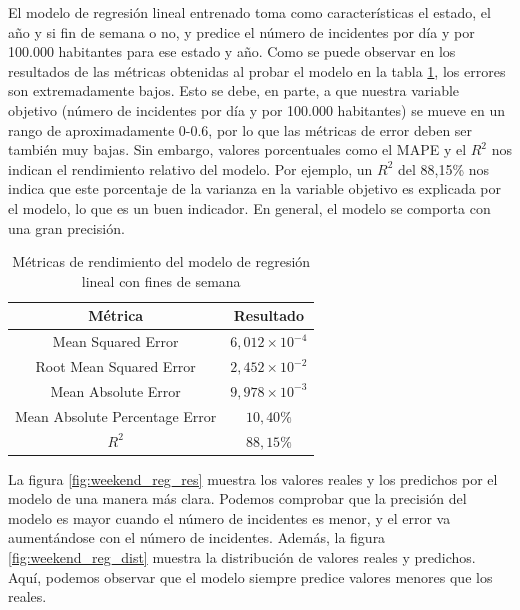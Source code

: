 \documentclass[11pt,a4paper]{article}
\begin{document}
El modelo de regresión lineal entrenado toma como características el estado, el año y si fin de semana o no, y predice el número de incidentes por día y por 100.000 habitantes para ese estado y año. Como se puede observar en los resultados de las métricas obtenidas al probar el modelo en la tabla \ref{tab:met_reg_fines}, los errores son extremadamente bajos. Esto se debe, en parte, a que nuestra variable objetivo (número de incidentes por día y por 100.000 habitantes) se mueve en un rango de aproximadamente 0-0.6, por lo que las métricas de error deben ser también muy bajas. Sin embargo, valores porcentuales como el MAPE y el $R^2$ nos indican el rendimiento relativo del modelo. Por ejemplo, un $R^2$ del 88,15\% nos indica que este porcentaje de la varianza en la variable objetivo es explicada por el modelo, lo que es un buen indicador. En general, el modelo se comporta con una gran precisión.

\begin{table}[H]
    \centering
    \begin{tabular}{|c|c|}
        \hline
        \textbf{Métrica} & \textbf{Resultado} \\
        \hline
        Mean Squared Error & $6,012 \times 10^{-4}$ \\
        \hline
        Root Mean Squared Error & $2,452 \times 10^{-2}$ \\
        \hline
        Mean Absolute Error & $9,978 \times 10^{-3}$ \\
        \hline
        Mean Absolute Percentage Error & $10,40\%$ \\
        \hline
        $R^2$ & $88,15\%$ \\
        \hline
    \end{tabular}
    \caption{Métricas de rendimiento del modelo de regresión lineal con fines de semana}
    \label{tab:met_reg_fines}
\end{table}

La figura \ref{fig:weekend_reg_res} muestra los valores reales y los predichos por el modelo de una manera más clara. Podemos comprobar que la precisión del modelo es mayor cuando el número de incidentes es menor, y el error va aumentándose con el número de incidentes. Además, la figura \ref{fig:weekend_reg_dist} muestra la distribución de valores reales y predichos. Aquí, podemos observar que el modelo siempre predice valores menores que los reales.
\end{document}
